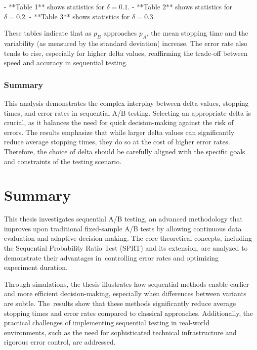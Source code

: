 \documentclass[magisterska, english]{pwr_wmat_praca_dyplomowa}
\theoremstyle{plain}
\numberwithin{theorem}{chapter}
\theoremstyle{definition}
\numberwithin{theorem}{chapter}
\begin{document}
- **Table 1** shows statistics for \( \delta = 0.1 \).
- **Table 2** shows statistics for \( \delta = 0.2 \).
- **Table 3** shows statistics for \( \delta = 0.3 \).

These tables indicate that as \( p_B \) approaches \( p_A \), the mean stopping time and the variability (as measured by the standard deviation) increase. The error rate also tends to rise, especially for higher delta values, reaffirming the trade-off between speed and accuracy in sequential testing.

\subsection{Summary}

This analysis demonstrates the complex interplay between delta values, stopping times, and error rates in sequential A/B testing. Selecting an appropriate delta is crucial, as it balances the need for quick decision-making against the risk of errors. The results emphasize that while larger delta values can significantly reduce average stopping times, they do so at the cost of higher error rates. Therefore, the choice of delta should be carefully aligned with the specific goals and constraints of the testing scenario.



{\backmatter \chapter{Summary}}

This thesis investigates sequential A/B testing, an advanced methodology that improves upon traditional fixed-sample A/B tests by allowing continuous data evaluation and adaptive decision-making. The core theoretical concepts, including the Sequential Probability Ratio Test (SPRT) and its extension, are analyzed to demonstrate their advantages in~controlling error rates and optimizing experiment duration.

Through simulations, the thesis illustrates how sequential methods enable earlier and more efficient decision-making, especially when differences between variants are subtle. The~results show that these methods significantly reduce average stopping times and error rates compared to classical approaches. Additionally, the practical challenges of implementing sequential testing in real-world environments, such as the need for sophisticated technical infrastructure and rigorous error control, are addressed.
\end{document}
